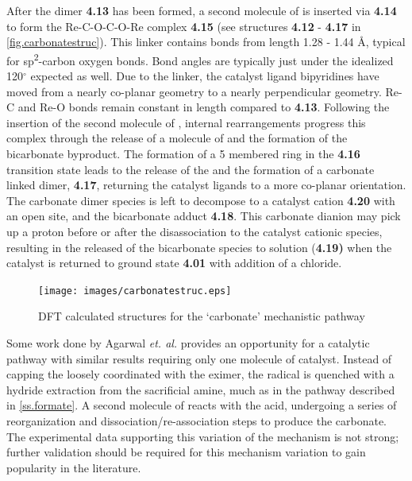 After the dimer \textbf{4.13} has been formed, a second molecule of  is inserted via \textbf{4.14} to form the Re-C-O-C-O-Re complex \textbf{4.15} (see structures \textbf{4.12} - \textbf{4.17} in \autoref{fig.carbonatestruc}). This linker contains bonds from length 1.28 - 1.44 \r{A}, typical for sp\textsuperscript{2}-carbon oxygen bonds. Bond angles are typically just under the idealized 120$^\circ$ expected as well. Due to the linker, the catalyst ligand bipyridines have moved from a nearly co-planar geometry to a nearly perpendicular geometry. Re-C and Re-O bonds remain constant in length compared to \textbf{4.13}. Following the insertion of the second molecule of , internal rearrangements progress this complex through the release of a molecule of  and the formation of the bicarbonate byproduct. The formation of a 5 membered ring in the \textbf{4.16} transition state leads to the release of the  and the formation of a carbonate linked dimer, \textbf{4.17}, returning the catalyst ligands to a more co-planar orientation. The carbonate dimer species is left to decompose to a catalyst cation \textbf{4.20} with an open site, and the bicarbonate adduct \textbf{4.18}. This carbonate dianion may pick up a proton before or after the disassociation to the catalyst cationic species, resulting in the released of the bicarbonate species to solution (\textbf{4.19)} when the catalyst is returned to ground state \textbf{4.01} with addition of a chloride. 

\begin{figure}[!ht]
 \begin{center}
  \texttt{[image: images/carbonatestruc.eps]}
 \end{center}
\caption{DFT calculated structures for the `carbonate' mechanistic pathway}
\label{fig.carbonatestruc}
\end{figure} 

Some work done by Agarwal \textit{et. al.} provides an opportunity for a catalytic pathway with similar results requiring only one molecule of catalyst\autocite{agarwal2012a}. Instead of capping the loosely coordinated  with the eximer, the radical is quenched with a hydride extraction from the sacrificial amine, much as in the pathway described in \autoref{ss.formate}. A second molecule of  reacts with the acid, undergoing a series of reorganization and dissociation/re-association steps to produce the carbonate. The experimental data supporting this variation of the mechanism is not strong; further validation should be required for this mechanism variation to gain popularity in the literature. 


